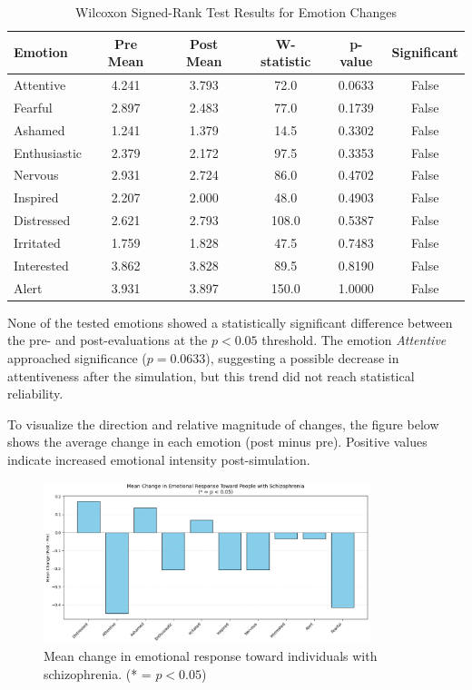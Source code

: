 \begin{table}[H]
\centering
\caption{Wilcoxon Signed-Rank Test Results for Emotion Changes}
\begin{tabular}{|l|c|c|c|c|c|}
\hline
\textbf{Emotion} & \textbf{Pre Mean} & \textbf{Post Mean} & \textbf{W-statistic} & \textbf{p-value} & \textbf{Significant} \\
\hline
Attentive     & 4.241 & 3.793 & 72.0  & 0.0633  & False \\
Fearful       & 2.897 & 2.483 & 77.0  & 0.1739  & False \\
Ashamed       & 1.241 & 1.379 & 14.5  & 0.3302  & False \\
Enthusiastic  & 2.379 & 2.172 & 97.5  & 0.3353  & False \\
Nervous       & 2.931 & 2.724 & 86.0  & 0.4702  & False \\
Inspired      & 2.207 & 2.000 & 48.0  & 0.4903  & False \\
Distressed    & 2.621 & 2.793 & 108.0 & 0.5387  & False \\
Irritated     & 1.759 & 1.828 & 47.5  & 0.7483  & False \\
Interested    & 3.862 & 3.828 & 89.5  & 0.8190  & False \\
Alert         & 3.931 & 3.897 & 150.0 & 1.0000  & False \\
\hline
\end{tabular}
\label{tab:wilcoxon_emotions}
\end{table}

None of the tested emotions showed a statistically significant difference between the pre- and post-evaluations at the $p < 0.05$ threshold. The emotion \textit{Attentive} approached significance ($p = 0.0633$), suggesting a possible decrease in attentiveness after the simulation, but this trend did not reach statistical reliability.

To visualize the direction and relative magnitude of changes, the figure below shows the average change in each emotion (post minus pre). Positive values indicate increased emotional intensity post-simulation.


\begin{figure}[H]
    \centering
    \includegraphics[width=0.85\textwidth]{../../Figures/mean-change-emotions.png}
    \caption{Mean change in emotional response toward individuals with schizophrenia. (* = $p < 0.05$)}
    \label{fig:emotion_change}
\end{figure}

